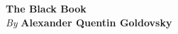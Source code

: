 

\thispagestyle{empty}

\vspace*{80pt}

\begin{raggedleft}
\fontsize{24pt}{24pt}\selectfont
\textbf{The Black Book}\\
\fi
\vspace*{1cm}
\fontsize{16pt}{18pt}\selectfont \textit{By } \textbf{Alexander Quentin Goldovsky}\\

\end{raggedleft}